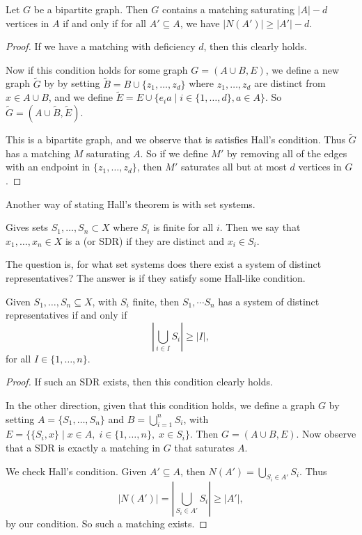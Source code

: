 \begin{corollary}
	Let $G$ be a bipartite graph. Then $G$ contains a matching saturating $|A|-d$ vertices in $A$ if and only if for all $A' \subseteq A$, we have $|N(A')| \geq |A'| - d$.
\end{corollary}
\begin{proof}
	If we have a matching with deficiency $d$, then this clearly holds.
	
	Now if this condition holds for some graph $G = (A\cup B, E)$, we define a new graph $\tilde{G}$ by by setting $\tilde{B} = B \cup \{z_1, \dots, z_d\}$ where $z_1, \dots, z_d$ are distinct from $x \in A \cup B$, and we define $\tilde{E} = E \cup \{e_i a \mid i \in \{1, \dots, d\}, a \in A\}$. So $\tilde{G} = (A \cup \tilde{B}, \tilde{E})$.
	
	This is a bipartite graph, and we observe that is satisfies Hall's condition. Thus $\tilde{G}$ has a matching $M$ saturating $A$. So if we define $M'$ by removing all of the edges with an endpoint in $\{z_1, \dots, z_d\}$, then $M'$ saturates all but at most $d$ vertices in $G$.
\end{proof}

Another way of stating Hall's theorem is with set systems.

\begin{definition}
Gives sets $S_1, \dots, S_n \subset X$ where $S_i$ is finite for all $i$. Then we say that $x_1, \dots, x_n \in X$ is a  (or SDR) if they are distinct and $x_i \in S_i$. 
\end{definition}

The question is, for what set systems does there exist a system of distinct representatives? The answer is if they satisfy some Hall-like condition.

\begin{corollary}
	Given $S_1, \dots, S_n \subseteq X$, with $S_i$ finite, then $S_1, \dotsm S_n$ has a system of distinct representatives if and only if
	$$
	\left|\bigcup_{i \in I} S_i\right| \geq |I|,
	 $$
	 for all $I \in \{1, \dots, n\}$.
\end{corollary}
\begin{proof}
	If such an SDR exists, then this condition clearly holds.

	In the other direction, given that this condition holds, we define a graph $G$ by setting $A = \{S_1, \dots, S_n\}$ and $B = \bigcup_{i = 1}^n S_i$, with $E = \{ \{S_i, x\} \mid x \in A,\; i \in \{1, \dots, n\}, \; x \in S_i\}$. Then $G = (A \cup B, E).$ Now observe that a SDR is exactly a matching in $G$ that saturates $A$.

	We check Hall's condition. Given $A' \subseteq A$, then $N(A') = \bigcup_{S_i \in A'} S_i$. Thus
	$$
	\left|N(A')\right| = \left|\bigcup_{S_i \in A'} S_i\right| \geq |A'|,
	$$
	by our condition. So such a matching exists.
\end{proof}


